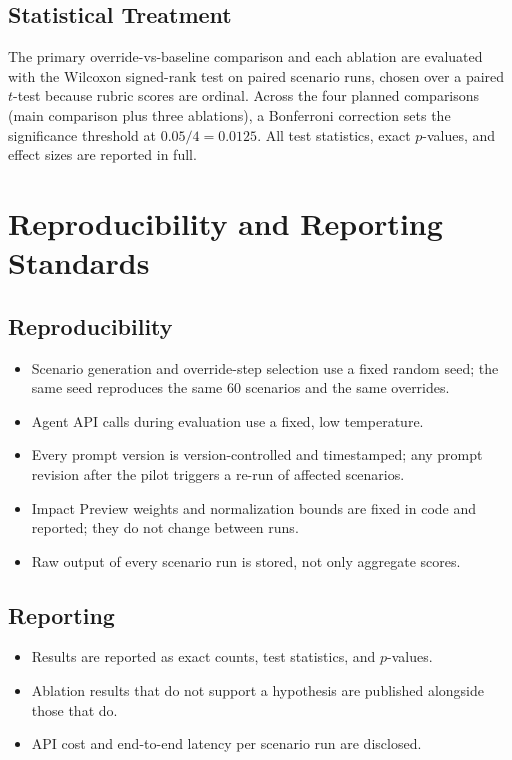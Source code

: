 \documentclass[conference]{IEEEtran}
\begin{document}
\subsection{Statistical Treatment}
The primary override-vs-baseline comparison and each ablation are evaluated with the Wilcoxon signed-rank test on paired scenario runs, chosen over a paired $t$-test because rubric scores are ordinal. Across the four planned comparisons (main comparison plus three ablations), a Bonferroni correction sets the significance threshold at $0.05/4 = 0.0125$. All test statistics, exact $p$-values, and effect sizes are reported in full.

\section{Reproducibility and Reporting Standards}
\label{sec:repro}
\subsection{Reproducibility}
\begin{itemize}
\item Scenario generation and override-step selection use a fixed random seed; the same seed reproduces the same 60 scenarios and the same overrides.
\item Agent API calls during evaluation use a fixed, low temperature.
\item Every prompt version is version-controlled and timestamped; any prompt revision after the pilot triggers a re-run of affected scenarios.
\item Impact Preview weights and normalization bounds are fixed in code and reported; they do not change between runs.
\item Raw output of every scenario run is stored, not only aggregate scores.
\end{itemize}

\subsection{Reporting}
\begin{itemize}
\item Results are reported as exact counts, test statistics, and $p$-values.
\item Ablation results that do not support a hypothesis are published alongside those that do.
\item API cost and end-to-end latency per scenario run are disclosed.
\end{itemize}
\end{document}
